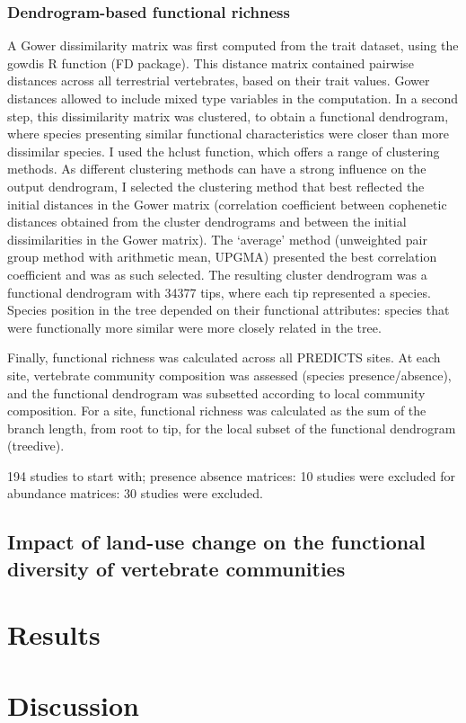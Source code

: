 \subsubsection{Dendrogram-based functional richness}
A Gower dissimilarity matrix was first computed from the trait dataset, using the gowdis R function (FD package). This distance matrix contained pairwise distances across all terrestrial vertebrates, based on their trait values. Gower distances allowed to include mixed type variables in the computation. In a second step, this dissimilarity matrix was clustered, to obtain a functional dendrogram, where species presenting similar functional characteristics were closer than more dissimilar species. I used the hclust function, which offers a range of clustering methods. As different clustering methods can have a strong influence on the output dendrogram, I selected the clustering method that best reflected the initial distances in the Gower matrix (correlation coefficient between cophenetic distances obtained from the cluster dendrograms and between the initial dissimilarities in the Gower matrix). The `average' method (unweighted pair group method with arithmetic mean, UPGMA) presented the best correlation coefficient and was as such selected. The resulting cluster dendrogram was a functional dendrogram with 34377 tips, where each tip represented a species. Species position in the tree depended on their functional attributes: species that were functionally more similar were more closely related in the tree.

Finally, functional richness was calculated across all PREDICTS sites. At each site, vertebrate community composition was assessed (species presence/absence), and the functional dendrogram was subsetted according to local community composition. For a site, functional richness was calculated as the sum of the branch length, from root to tip, for the local subset of the functional dendrogram (treedive).

194 studies to start with; presence absence matrices: 10 studies were excluded
for abundance matrices: 30 studies were excluded.

\subsection{Impact of land-use change on the functional diversity of vertebrate communities}

\section{Results}

\section{Discussion}
